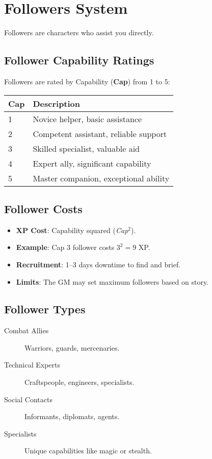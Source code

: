 \section{Followers System}

Followers are characters who assist you directly.

\subsection*{Follower Capability Ratings}
Followers are rated by Capability (\textbf{Cap}) from 1 to 5:
\begin{center}
\small
\begin{tabular}{ll}
\toprule
\textbf{Cap} & \textbf{Description} \\
\midrule
1 & Novice helper, basic assistance \\
2 & Competent assistant, reliable support \\
3 & Skilled specialist, valuable aid \\
4 & Expert ally, significant capability \\
5 & Master companion, exceptional ability \\
\bottomrule
\end{tabular}
\end{center}

\subsection*{Follower Costs}
\begin{itemize}
\item \textbf{XP Cost}: Capability squared (\emph{Cap}$^2$).
\item \textbf{Example}: Cap 3 follower costs $3^2=9$ XP.
\item \textbf{Recruitment}: 1--3 days downtime to find and brief.
\item \textbf{Limits}: The GM may set maximum followers based on story.
\end{itemize}

\subsection*{Follower Types}
\begin{description}
\item[Combat Allies] Warriors, guards, mercenaries.
\item[Technical Experts] Craftspeople, engineers, specialists.
\item[Social Contacts] Informants, diplomats, agents.
\item[Specialists] Unique capabilities like magic or stealth.
\end{description}

